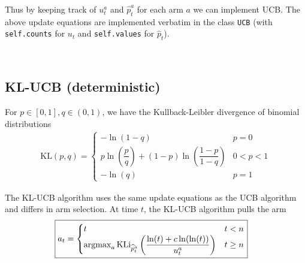 Thus by keeping track of $u_t^a$ and $\hat{p}_t^a$ for each arm $a$ we can implement UCB. The above update equations are implemented verbatim in the class \lstinline{UCB} (with \lstinline{self.counts} for $u_t$ and \lstinline{self.values} for $\hat{p}_t$).

\begin{figure}[h]
    \caption{Regret vs Horizon (note the different y-axis scales). Logarithmic regret is observed for UCB, KL-UCB and Thompson Sampling.}
    \begin{subfigure}[b]{0.5\textwidth}
        \centering
        
    \end{subfigure}
    \begin{subfigure}[b]{0.5\textwidth}
        \centering
        
    \end{subfigure} \\
    \begin{subfigure}[b]{0.5\textwidth}
        \centering
        
    \end{subfigure}
    \begin{subfigure}[b]{0.5\textwidth}
        \centering
        
    \end{subfigure}
\end{figure}

\subsection{KL-UCB (deterministic)}
For $p\in[0,1], q\in(0,1)$, we have the Kullback-Leibler divergence of binomial distributions
\begin{align*}
    \text{KL}(p, q) = \begin{cases}
        -\ln(1 - q) & p = 0 \\
        p\ln(\dfrac{p}{q}) + (1 - p)\ln(\dfrac{1 - p}{1 - q}) & 0 < p < 1 \\
        -\ln(q) & p = 1
    \end{cases}
\end{align*}

The KL-UCB algorithm uses the same update equations as the UCB algorithm and differs in arm selection. At time $t$, the KL-UCB algorithm pulls the arm
\begin{align*}
    \Aboxed{a_t = {\begin{cases}
        t & t < n \\
        \argmax_{a} \text{KLi}_{\hat{p}_t^a}\left(\dfrac{\ln(t) + c\ln(\ln(t))}{u_t^a}\right) & t \geq n
    \end{cases}}}
\end{align*}

